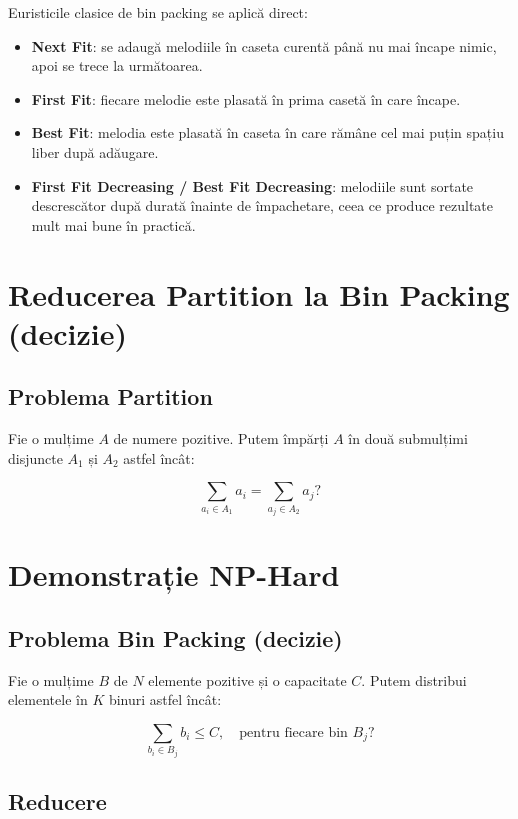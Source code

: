 \documentclass[runningheads]{llncs}
\begin{document}
	Euristicile clasice de bin packing se aplică direct:

	\begin{itemize}
		\item \textbf{Next Fit}: se adaugă melodiile în caseta curentă până nu mai încape nimic, apoi se trece la următoarea.
		\item \textbf{First Fit}: fiecare melodie este plasată în prima casetă în care încape.
		\item \textbf{Best Fit}: melodia este plasată în caseta în care rămâne cel mai puțin spațiu liber după adăugare.
		\item \textbf{First Fit Decreasing / Best Fit Decreasing}: melodiile sunt sortate descrescător după durată înainte de împachetare, ceea ce produce rezultate mult mai bune în practică.
	\end{itemize}

	\section{Reducerea Partition la Bin Packing (decizie)}

	\subsection{Problema Partition}

	Fie o mulțime $A$ de numere pozitive. Putem împărți $A$ în două submulțimi disjuncte $A_1$ și $A_2$ astfel încât:


	\[
	\sum_{a_i \in A_1} a_i = \sum_{a_j \in A_2} a_j?
	\]


	\section{Demonstrație NP-Hard}
	\subsection{Problema Bin Packing (decizie)}

	Fie o mulțime $B$ de $N$ elemente pozitive și o capacitate $C$. Putem distribui elementele în $K$ binuri astfel încât:


	\[
	\sum_{b_i \in B_j} b_i \le C, \quad \text{pentru fiecare bin } B_j?
	\]



	\subsection{Reducere}
\end{document}
